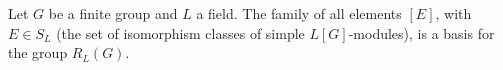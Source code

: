 Let $G$ be a finite group and $L$ a field. The family of all elements $[E]$, with $E \in S_L$ (the set of isomorphism classes of simple $L[G]$-modules), is a basis for the group $R_L(G)$.
